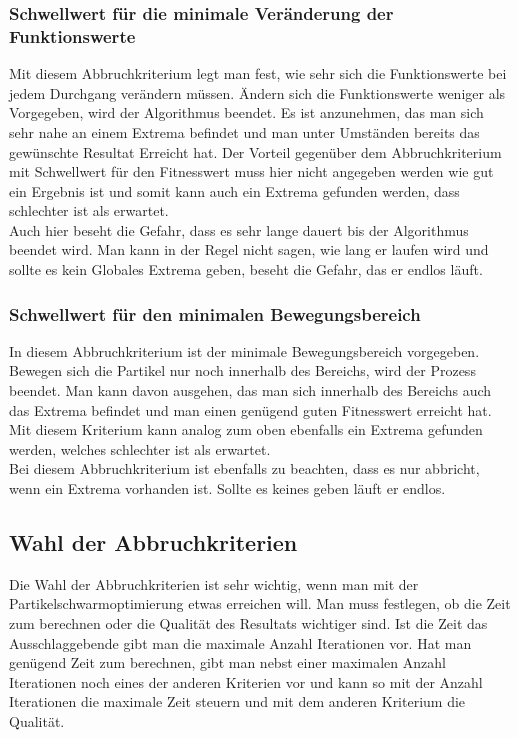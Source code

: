 \subsubsection{Schwellwert für die minimale Veränderung der Funktionswerte}
Mit diesem Abbruchkriterium legt man fest, wie sehr sich die Funktionswerte bei jedem Durchgang verändern müssen. Ändern sich die Funktionswerte weniger als Vorgegeben, wird der Algorithmus beendet. Es ist anzunehmen, das man sich sehr nahe an einem Extrema befindet und man unter Umständen bereits das gewünschte Resultat Erreicht hat. Der Vorteil gegenüber dem Abbruchkriterium mit Schwellwert für den Fitnesswert muss hier nicht angegeben werden wie gut ein Ergebnis ist und somit kann auch ein Extrema gefunden werden, dass schlechter ist als erwartet. \\ 
Auch hier beseht die Gefahr, dass es sehr lange dauert bis der Algorithmus beendet wird. Man kann in der Regel nicht sagen, wie lang er laufen wird und sollte es kein Globales Extrema geben, beseht die Gefahr, das er endlos läuft. 

\subsubsection{Schwellwert für den minimalen Bewegungsbereich}
In diesem Abbruchkriterium ist der minimale Bewegungsbereich vorgegeben. Bewegen sich die Partikel nur noch innerhalb des Bereichs, wird der Prozess beendet. Man kann davon ausgehen, das man sich innerhalb des Bereichs auch das Extrema befindet und man einen genügend guten Fitnesswert erreicht hat. Mit diesem Kriterium kann analog zum oben ebenfalls ein Extrema gefunden werden, welches schlechter ist als erwartet.\\
Bei diesem Abbruchkriterium ist ebenfalls zu beachten, dass es nur abbricht, wenn ein Extrema vorhanden ist. Sollte es keines geben läuft er endlos.

\subsection{Wahl der Abbruchkriterien}
Die Wahl der Abbruchkriterien ist sehr wichtig, wenn man mit der Partikelschwarmoptimierung etwas erreichen will. Man muss festlegen, ob die Zeit zum berechnen oder die Qualität des Resultats wichtiger sind. Ist die Zeit das Ausschlaggebende gibt man die maximale Anzahl Iterationen vor. Hat man genügend Zeit zum berechnen, gibt man nebst einer maximalen Anzahl Iterationen noch eines der anderen Kriterien vor und kann so mit der Anzahl Iterationen die maximale Zeit steuern und mit dem anderen Kriterium die Qualität. 

